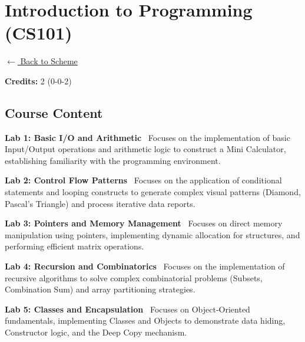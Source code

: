 \section*{Introduction to Programming (CS101)}
\label{course:CX101}

\noindent \small{\hyperref[main:scheme]{$\leftarrow$ Back to Scheme}} \vspace{0.5cm}

\noindent \textbf{Credits:} 2 (0-0-2)

\subsection*{Course Content}
\noindent\textbf{Lab 1: Basic I/O and Arithmetic} \
Focuses on the implementation of basic Input/Output operations and arithmetic logic to construct a Mini Calculator, establishing familiarity with the programming environment. \\

\vspace{0.2cm}

\noindent\textbf{Lab 2: Control Flow Patterns} \
Focuses on the application of conditional statements and looping constructs to generate complex visual patterns (Diamond, Pascal’s Triangle) and process iterative data reports. \\

\vspace{0.2cm}

\noindent\textbf{Lab 3: Pointers and Memory Management} \
Focuses on direct memory manipulation using pointers, implementing dynamic allocation for structures, and performing efficient matrix operations. \\

\vspace{0.2cm}

\noindent\textbf{Lab 4: Recursion and Combinatorics} \
Focuses on the implementation of recursive algorithms to solve complex combinatorial problems (Subsets, Combination Sum) and array partitioning strategies. \\

\vspace{0.2cm}

\noindent\textbf{Lab 5: Classes and Encapsulation} \
Focuses on Object-Oriented fundamentals, implementing Classes and Objects to demonstrate data hiding, Constructor logic, and the Deep Copy mechanism. \\


